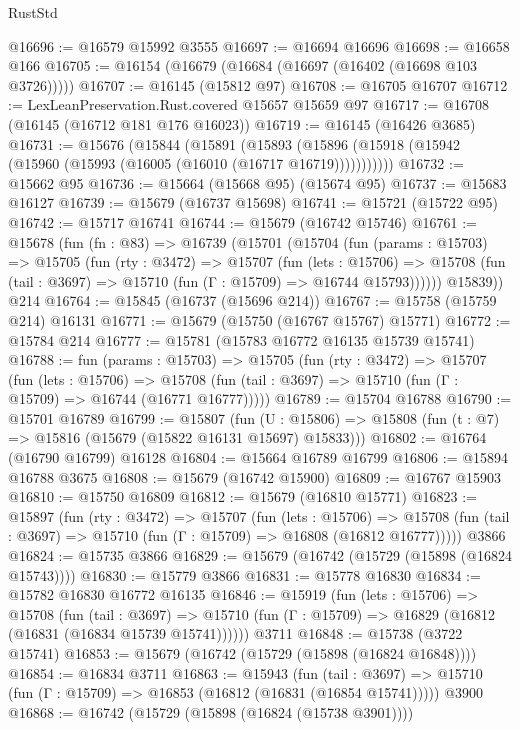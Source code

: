\begin{lexlean}{RustStd}
\begin{coremodule}
{\begin{coremodule}
{{{{{{{{{{{{{{{{{{{{{{{{{{{{{{{{{{{{{{{{{{{{{{{@16696 := @16579 @15992 @3555
@16697 := @16694 @16696
@16698 := @16658 @166
@16705 := @16154 (@16679 (@16684 (@16697 (@16402 (@16698 @103 @3726)))))
@16707 := @16145 (@15812 @97)
@16708 := @16705 @16707
@16712 := LexLeanPreservation.Rust.covered @15657 @15659 @97
@16717 := @16708 (@16145 (@16712 @181 @176 @16023))
@16719 := @16145 (@16426 @3685)
@16731 := @15676
    (@15844
      (@15891
        (@15893 (@15896 (@15918 (@15942 (@15960 (@15993 (@16005 (@16010 (@16717 @16719)))))))))))
@16732 := @15662 @95
@16736 := @15664 (@15668 @95) (@15674 @95)
@16737 := @15683 @16127
@16739 := @15679 (@16737 @15698)
@16741 := @15721 (@15722 @95)
@16742 := @15717 @16741
@16744 := @15679 (@16742 @15746)
@16761 := @15678
    (fun (fn : @83) =>
    @16739
      (@15701
        (@15704
          (fun (params : @15703) =>
          @15705
            (fun (rty : @3472) =>
            @15707
              (fun (lets : @15706) =>
              @15708 (fun (tail : @3697) => @15710 (fun (Γ : @15709) => @16744 @15793))))))
        @15839))
    @214
@16764 := @15845 (@16737 (@15696 @214))
@16767 := @15758 (@15759 @214) @16131
@16771 := @15679 (@15750 (@16767 @15767) @15771)
@16772 := @15784 @214
@16777 := @15781 (@15783 @16772 @16135 @15739 @15741)
@16788 := fun (params : @15703) =>
  @15705
    (fun (rty : @3472) =>
    @15707
      (fun (lets : @15706) =>
      @15708 (fun (tail : @3697) => @15710 (fun (Γ : @15709) => @16744 (@16771 @16777)))))
@16789 := @15704 @16788
@16790 := @15701 @16789
@16799 := @15807
    (fun (U : @15806) => @15808 (fun (t : @7) => @15816 (@15679 (@15822 @16131 @15697) @15833)))
@16802 := @16764 (@16790 @16799) @16128
@16804 := @15664 @16789 @16799
@16806 := @15894 @16788 @3675
@16808 := @15679 (@16742 @15900)
@16809 := @16767 @15903
@16810 := @15750 @16809
@16812 := @15679 (@16810 @15771)
@16823 := @15897
    (fun (rty : @3472) =>
    @15707
      (fun (lets : @15706) =>
      @15708 (fun (tail : @3697) => @15710 (fun (Γ : @15709) => @16808 (@16812 @16777)))))
    @3866
@16824 := @15735 @3866
@16829 := @15679 (@16742 (@15729 (@15898 (@16824 @15743))))
@16830 := @15779 @3866
@16831 := @15778 @16830
@16834 := @15782 @16830 @16772 @16135
@16846 := @15919
    (fun (lets : @15706) =>
    @15708
      (fun (tail : @3697) =>
      @15710 (fun (Γ : @15709) => @16829 (@16812 (@16831 (@16834 @15739 @15741))))))
    @3711
@16848 := @15738 (@3722 @15741)
@16853 := @15679 (@16742 (@15729 (@15898 (@16824 @16848))))
@16854 := @16834 @3711
@16863 := @15943
    (fun (tail : @3697) => @15710 (fun (Γ : @15709) => @16853 (@16812 (@16831 (@16854 @15741)))))
    @3900
@16868 := @16742 (@15729 (@15898 (@16824 (@15738 @3901))))
}}}}}}}}}}}}}}}}}}}}}}}}}}}}}}}}}}}}}}}}}}}}}}}
\end{coremodule}}
\end{coremodule}
\end{lexlean}
